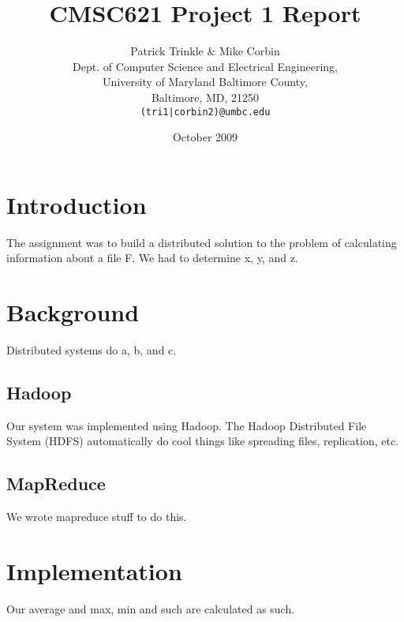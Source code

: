 \documentclass[11pt]{article}
\title{CMSC621 Project 1 Report}
\author{Patrick Trinkle \& Mike Corbin\\
Dept. of Computer Science and Electrical Engineering,\\
University of Maryland Baltimore County,\\
Baltimore, MD, 21250\\
\texttt{(tri1|corbin2)@umbc.edu}}
\date{October 2009}
\begin{document}
\maketitle

\section{Introduction}
The assignment was to build a distributed solution to the problem of calculating information about a file F.  We had to determine x, y, and z.

\section{Background}
Distributed systems do a, b, and c.

\subsection{Hadoop}
Our system was implemented using Hadoop.  The Hadoop Distributed File System (HDFS) automatically do cool things like spreading files, replication, etc.

\subsection{MapReduce}
We wrote mapreduce stuff to do this.

\section{Implementation}
Our average and max, min and such are calculated as such.
\end{document}
